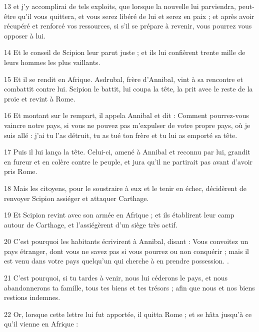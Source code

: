 \par 13 et j'y accomplirai de tels exploits, que lorsque la nouvelle lui parviendra, peut-être qu'il vous quittera, et vous serez libéré de lui et serez en paix ; et après avoir récupéré et renforcé vos ressources, si s'il se prépare à revenir, vous pourrez vous opposer à lui.

\par 14 Et le conseil de Scipion leur parut juste ; et ils lui confièrent trente mille de leurs hommes les plus vaillants.

\par 15 Et il se rendit en Afrique. Asdrubal, frère d'Annibal, vint à sa rencontre et combattit contre lui. Scipion le battit, lui coupa la tête, la prit avec le reste de la proie et revint à Rome.

\par 16 Et montant sur le rempart, il appela Annibal et dit : Comment pourrez-vous vaincre notre pays, si vous ne pouvez pas m'expulser de votre propre pays, où je suis allé : j'ai tu l'as détruit, tu as tué ton frère et tu lui as emporté sa tête.

\par 17 Puis il lui lança la tête. Celui-ci, amené à Annibal et reconnu par lui, grandit en fureur et en colère contre le peuple, et jura qu'il ne partirait pas avant d'avoir pris Rome.

\par 18 Mais les citoyens, pour le soustraire à eux et le tenir en échec, décidèrent de renvoyer Scipion assiéger et attaquer Carthage.

\par 19 Et Scipion revint avec son armée en Afrique ; et ils établirent leur camp autour de Carthage, et l'assiégèrent d'un siège très actif.

\par 20 C'est pourquoi les habitants écrivirent à Annibal, disant : Vous convoitez un pays étranger, dont vous ne savez pas si vous pourrez ou non conquérir ; mais il est venu dans votre pays quelqu'un qui cherche à en prendre possession. .

\par 21 C'est pourquoi, si tu tardes à venir, nous lui céderons le pays, et nous abandonnerons ta famille, tous tes biens et tes trésors ; afin que nous et nos biens restions indemnes.

\par 22 Or, lorsque cette lettre lui fut apportée, il quitta Rome ; et se hâta jusqu'à ce qu'il vienne en Afrique :

